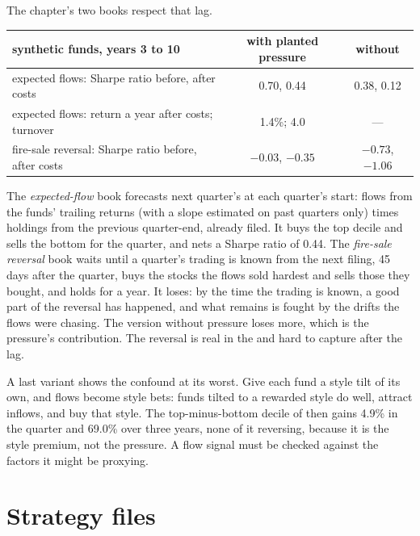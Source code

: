 The chapter's two books respect that lag.

\begin{center}
\small
\begin{tabular}{@{}lcc@{}}
\toprule
synthetic funds, years 3 to 10 & with planted pressure & without\\
\midrule
expected flows: Sharpe ratio before, after costs & 0.70, 0.44 & 0.38, 0.12\\
expected flows: return a year after costs; turnover & 1.4\%; 4.0 & ---\\
fire-sale reversal: Sharpe ratio before, after costs & $-0.03$, $-0.35$ & $-0.73$, $-1.06$\\
\bottomrule
\end{tabular}
\end{center}

The \emph{expected-flow} book forecasts next quarter's  at each quarter's start: flows from the funds' trailing returns (with a slope
estimated on past quarters only) times holdings from the previous quarter-end, already filed. It buys the top decile and sells the bottom for the quarter,
and nets a Sharpe ratio of 0.44. The \emph{fire-sale reversal} book waits until a quarter's trading is known from the next filing, 45 days after the quarter,
buys the stocks the flows sold hardest and sells those they bought, and holds for a year. It loses: by the time the trading is known, a good part of the
reversal has happened, and what remains is fought by the drifts the flows were chasing. The version without pressure loses more, which is the pressure's
contribution. The reversal is real in the  and hard to capture after the lag.

A last variant shows the confound at its worst. Give each fund a style tilt of its own, and flows become style bets: funds tilted to a rewarded style do
well, attract inflows, and buy that style. The top-minus-bottom decile of  then gains 4.9\% in the quarter and 69.0\% over three years,
none of it reversing, because it is the style premium, not the pressure. A flow signal must be checked against the factors it might be proxying.

\section{Strategy files}

